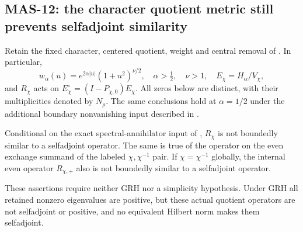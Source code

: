 \subsection{MAS-12: the character quotient metric still prevents selfadjoint similarity}
Retain the fixed character, centered quotient, weight and central removal of . In particular,
\[
 w_\alpha(u)=e^{2\alpha|u|}(1+u^2)^{\nu/2},\quad
 \alpha>\tfrac12,\quad\nu>1,\quad
 E_\chi=H_\alpha/V_\chi,
\]
and $R_\chi$ acts on $E_\chi^\circ=(I-P_{\chi,0})E_\chi$. All zeros below are distinct, with their multiplicities denoted by $N_\rho$. The same conclusions hold at $\alpha=1/2$ under the additional boundary nonvanishing input described in .

\begin{proposition}
Conditional on the exact spectral-annihilator input of , $R_\chi$ is not boundedly similar to a selfadjoint operator. The same is true of the operator on the even exchange summand of the labeled $\chi,\chi^{-1}$ pair. If $\chi=\chi^{-1}$ globally, the internal even operator $R_{\chi,+}$ also is not boundedly similar to a selfadjoint operator.

These assertions require neither GRH nor a simplicity hypothesis. Under GRH all retained nonzero eigenvalues are positive, but these actual quotient operators are not selfadjoint or positive, and no equivalent Hilbert norm makes them selfadjoint.
\end{proposition}
